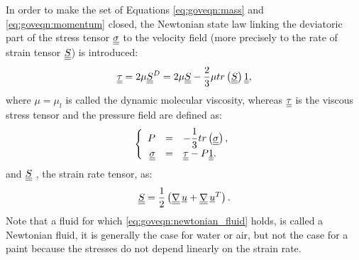 In order to make the set of Equations \eqref{eq:goveqn:mass} and \eqref{eq:goveqn:momentum} closed, the Newtonian state law
linking the deviatoric part of the stress tensor $\underline{\underline{\sigma}}$ to the velocity field (more precisely to the rate of strain tensor $\underline{\underline{S}}$)
is introduced:
%
\begin{equation}\label{eq:goveqn:newtonian_fluid}
\underline{\underline{\tau}}=2 \mu \underline{\underline{S}}^D = 2 \mu  \underline{\underline{S}}-\frac{2}{3}\mu  tr \left(\underline{\underline{S}} \right) \underline{\underline{1}},
\end{equation}
%
where $\mu =\mu_l $ is called  the dynamic molecular viscosity,
whereas $\underline{\underline{\tau}}$ is the viscous stress tensor and the pressure field are defined as:
%
\begin{equation}
\left\lbrace
\begin{array}{r c l}
P &=& -\dfrac{1}{3} tr \left( \underline{\underline{\sigma}} \right), \\
\underline{\underline{\sigma}} & = & \underline{\underline{\tau}}-P\underline{\underline{1}}.
\end{array}
\right.
\end{equation}
%
and $\underline{\underline{S}}$ , the strain rate tensor, as:
\begin{equation}\label{eq:goveqn:base_introd_strainrate}
 \underline{\underline{S}}=\frac{1}{2} \left( \underline{\underline{\nabla}} \, \underline{u}+ \underline{\underline{\nabla}} \, \underline{u}^T \right).
\end{equation}
%
%
%
Note that a fluid for which \eqref{eq:goveqn:newtonian_fluid} holds, is called a Newtonian fluid, it is generally the case
for water or air, but not the case for a paint because the stresses do not depend linearly on the strain rate.

